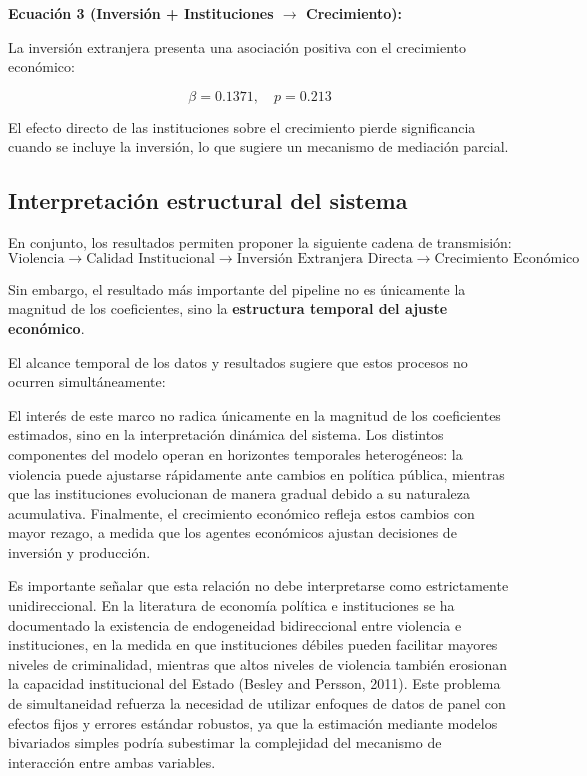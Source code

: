 \documentclass[11pt,a4paper]{article}
\begin{document}
\textbf{Ecuación 3 (Inversión + Instituciones $\rightarrow$ Crecimiento):}

La inversión extranjera presenta una asociación positiva con el crecimiento económico:

\[
\beta = 0.1371, \quad p = 0.213
\]

El efecto directo de las instituciones sobre el crecimiento pierde significancia cuando se incluye la inversión, lo que sugiere un mecanismo de mediación parcial.

\subsection{Interpretación estructural del sistema}

En conjunto, los resultados permiten proponer la siguiente cadena de transmisión:
\vspace{-0.25em}
\[
\text{Violencia}
\longrightarrow
\text{Calidad Institucional}
\longrightarrow
\text{Inversión Extranjera Directa}
\longrightarrow
\text{Crecimiento Económico}
\]

Sin embargo, el resultado más importante del pipeline no es únicamente la magnitud de los coeficientes, sino la \textbf{estructura temporal del ajuste económico}.

El alcance temporal de los datos y resultados sugiere que estos procesos no ocurren simultáneamente:

El interés de este marco no radica únicamente en la magnitud de los coeficientes estimados, sino en la interpretación dinámica del sistema. Los distintos componentes del modelo operan en horizontes temporales heterogéneos: la violencia puede ajustarse rápidamente ante cambios en política pública, mientras que las instituciones evolucionan de manera gradual debido a su naturaleza acumulativa. Finalmente, el crecimiento económico refleja estos cambios con mayor rezago, a medida que los agentes económicos ajustan decisiones de inversión y producción.

Es importante señalar que esta relación no debe interpretarse como estrictamente unidireccional. En la literatura de economía política e instituciones se ha documentado la existencia de endogeneidad bidireccional entre violencia e instituciones, en la medida en que instituciones débiles pueden facilitar mayores niveles de criminalidad, mientras que altos niveles de violencia también erosionan la capacidad institucional del Estado (Besley and Persson, 2011). Este problema de simultaneidad refuerza la necesidad de utilizar enfoques de datos de panel con efectos fijos y errores estándar robustos, ya que la estimación mediante modelos bivariados simples podría subestimar la complejidad del mecanismo de interacción entre ambas variables.
\end{document}
